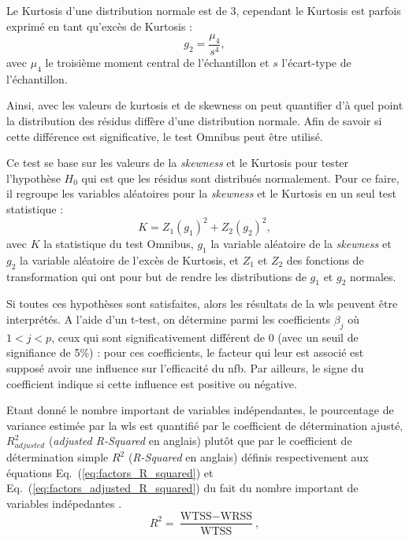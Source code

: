 Le Kurtosis d'une distribution normale est de 3, cependant le Kurtosis est parfois exprimé en tant qu'excès de Kurtosis :
\begin{equation}
\label{eq:factors_kurtosis_excess}
g_{2} = \frac{ \mu_{4} } {s^4}, 
\end{equation}
avec $\mu_{4}$ le troisième moment central de l'échantillon et $s$ l'écart-type de l'échantillon.

Ainsi, avec les valeurs de kurtosis et de skewness on peut quantifier d'à quel point la distribution des résidus diffère 
d'une distribution normale. Afin de savoir si cette différence est significative, le test Omnibus peut être utilisé. 

Ce test se base sur les valeurs de la \textit{skewness} et le Kurtosis pour tester l'hypothèse $H_{0}$ qui est que les résidus sont distribués normalement.
Pour ce faire, il regroupe les variables aléatoires pour la \textit{skewness} et le Kurtosis en un seul test statistique :
\begin{equation}
\label{eq:factors_omnibus_statistic}
K = Z_{1}(g_{1})^2 + Z_{2}(g_{2})^2, 
\end{equation}
avec $K$ la statistique du test Omnibus, $g_{1}$ la variable aléatoire de la \textit{skewness} et
$g_{2}$ la variable aléatoire de l'excès de Kurtosis, et $Z_{1}$ et $Z_{2}$ des fonctions de transformation qui ont pour but de rendre 
les distributions de $g_{1}$ et $g_{2}$ normales.

Si toutes ces hypothèses sont satisfaites, alors les résultats de la \gls{wls} peuvent être interprétés. A l'aide d'un t-test, on détermine  
parmi les coefficients $\beta_{j}$ où $1<j<p$, ceux qui sont significativement différent de 0 (avec un seuil de signifiance de 5\%) : 
pour ces coefficients, le facteur qui leur est associé est supposé avoir une influence sur l'efficacité du \gls{nfb}. Par ailleurs, 
le signe du coefficient indique si cette influence est positive ou négative. 

Etant donné le nombre important de variables indépendantes, le pourcentage de variance estimée par la \gls{wls} est quantifié par le coefficient de 
détermination ajusté, $R^2_{adjusted}$ (\textit{adjusted R-Squared} en anglais) plutôt que par le coefficient de détermination simple $R^2$ (\textit{R-Squared} en anglais)
définis respectivement aux équations Eq.~(\ref{eq:factors_R_squared}) et Eq.~(\ref{eq:factors_adjusted_R_squared}) du fait du nombre important de variables indépedantes \citep{James2013}.
\begin{equation}
\label{eq:factors_R_squared}
R^2 = \frac{ \text{WTSS} - \text{WRSS} }{ \text{WTSS} }, 
\end{equation}


